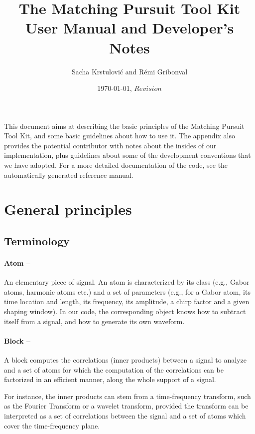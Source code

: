 \documentclass[11pt,a4paper]{article}
\title{The Matching Pursuit Tool Kit \\ User Manual and Developer's Notes}
\author{Sacha Krstulovi\'c and R\'emi Gribonval}
\date{\today, $Revision$}
\begin{document}
\maketitle

\vfill

\tableofcontents

\vfill

\clearpage

\noindent This document aims at describing the basic principles of the Matching
Pursuit Tool Kit, and some basic guidelines about how to use it.  The appendix
also provides the potential contributor with notes about the insides of our
implementation, plus guidelines about some of the development conventions that
we have adopted. For a more detailed documentation of the code, see the
automatically generated reference manual.

\section{General principles \label{gen}}

\subsection{Terminology \label{term}}
\paragraph{Atom --} An elementary piece of signal. An atom is characterized by
its class (e.g., Gabor atoms, harmonic atoms etc.) and a set of parameters
(e.g., for a Gabor atom, its time location and length, its frequency, its
amplitude, a chirp factor and a given shaping window). In our code, the
corresponding object knows how to subtract itself from a signal, and how to
generate its own waveform.

\paragraph{Block --} A block computes the correlations (inner products) between
a signal to analyze and a set of atoms for which the computation of the
correlations can be factorized in an efficient manner, along the whole support
of a signal.

For instance, the inner products can stem from a time-frequency transform, such
as the Fourier Transform or a wavelet transform, provided the transform can be
interpreted as a set of correlations between the signal and a set of atoms
which cover the time-frequency plane.
\end{document}
